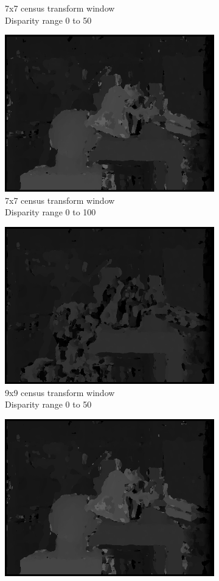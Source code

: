 \begin{figure}
\begin{subfigure}{.5\textwidth}
  \caption{7x7 census transform window \\Disparity range 0 to 50}
  \label{fig:sfig3}
\end{subfigure}%
\begin{subfigure}{.5\textwidth}
  \centering
  \includegraphics[width=.8\linewidth]{figures/CT7D0-100}
  \caption{7x7 census transform window \\Disparity range 0 to 100}
  \label{fig:sfig4}
\end{subfigure}
\begin{subfigure}{.5\textwidth}
  \centering
  \includegraphics[width=.8\linewidth]{figures/CT9D0-50}
  \caption{9x9 census transform window \\Disparity range 0 to 50}
  \label{fig:sfig5}
\end{subfigure}%
\begin{subfigure}{.5\textwidth}
  \centering
  \includegraphics[width=.8\linewidth]{figures/CT9D0-100}

\end{subfigure}
\end{figure}
